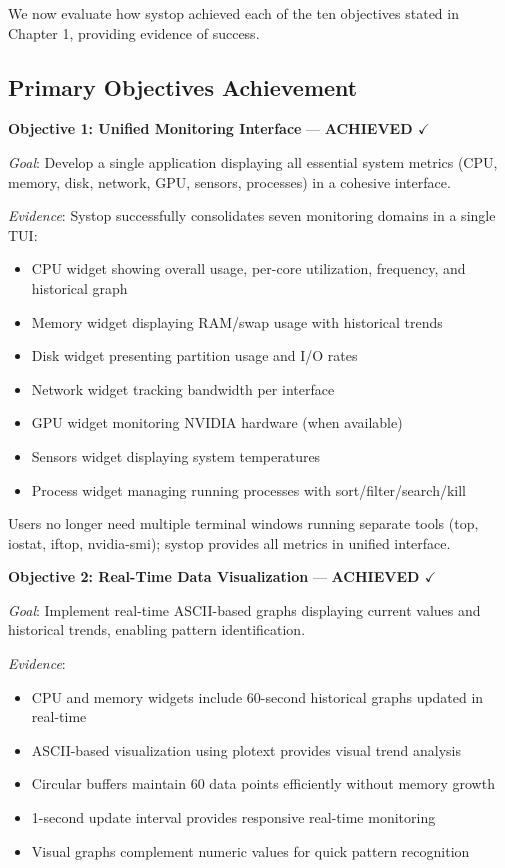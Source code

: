 \documentclass[12pt,a4paper,oneside]{report}
\begin{document}
We now evaluate how systop achieved each of the ten objectives stated in Chapter 1, providing evidence of success.

\subsection{Primary Objectives Achievement}

\textbf{Objective 1: Unified Monitoring Interface} --- \textbf{ACHIEVED $\checkmark$}

\textit{Goal}: Develop a single application displaying all essential system metrics (CPU, memory, disk, network, GPU, sensors, processes) in a cohesive interface.

\textit{Evidence}: Systop successfully consolidates seven monitoring domains in a single TUI:
\begin{itemize}
    \item CPU widget showing overall usage, per-core utilization, frequency, and historical graph
    \item Memory widget displaying RAM/swap usage with historical trends
    \item Disk widget presenting partition usage and I/O rates
    \item Network widget tracking bandwidth per interface
    \item GPU widget monitoring NVIDIA hardware (when available)
    \item Sensors widget displaying system temperatures
    \item Process widget managing running processes with sort/filter/search/kill
\end{itemize}

Users no longer need multiple terminal windows running separate tools (top, iostat, iftop, nvidia-smi); systop provides all metrics in unified interface.

\textbf{Objective 2: Real-Time Data Visualization} --- \textbf{ACHIEVED $\checkmark$}

\textit{Goal}: Implement real-time ASCII-based graphs displaying current values and historical trends, enabling pattern identification.

\textit{Evidence}: 
\begin{itemize}
    \item CPU and memory widgets include 60-second historical graphs updated in real-time
    \item ASCII-based visualization using plotext provides visual trend analysis
    \item Circular buffers maintain 60 data points efficiently without memory growth
    \item 1-second update interval provides responsive real-time monitoring
    \item Visual graphs complement numeric values for quick pattern recognition
\end{itemize}
\end{document}
